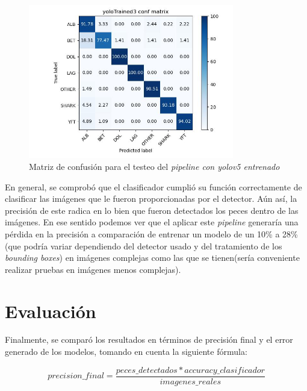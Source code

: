 \begin{figure}[h!]
\centering
\includegraphics[width=0.8\textwidth]{images/yoloTrained3_conf_matrix.jpg}
\caption{Matriz de confusión para el testeo del \textit{pipeline con yolov5 entrenado} }
\label{fig:confusionMatrix3}
\end{figure}

En general, se comprobó que el clasificador cumplió su función correctamente de clasificar las imágenes que le fueron proporcionadas por el detector. Aún así, la precisión de este radica en lo bien que fueron detectados los peces dentro de las imágenes. En ese sentido podemos ver que el aplicar este \textit{pipeline} generaría una pérdida en la precisión a comparación de entrenar un modelo de un 10\% a 28\% (que podría variar dependiendo del detector usado y del tratamiento de los \textit{bounding boxes}) en imágenes complejas como las que se tienen(sería conveniente realizar pruebas en imágenes menos complejas).

\section{Evaluación}

Finalmente, se comparó los resultados en términos de precisión final y el error generado de los modelos, tomando en cuenta la siguiente fórmula:

$$ precision\_final = \frac{peces\_detectados * accuracy\_clasificador}{imagenes\_reales}$$

